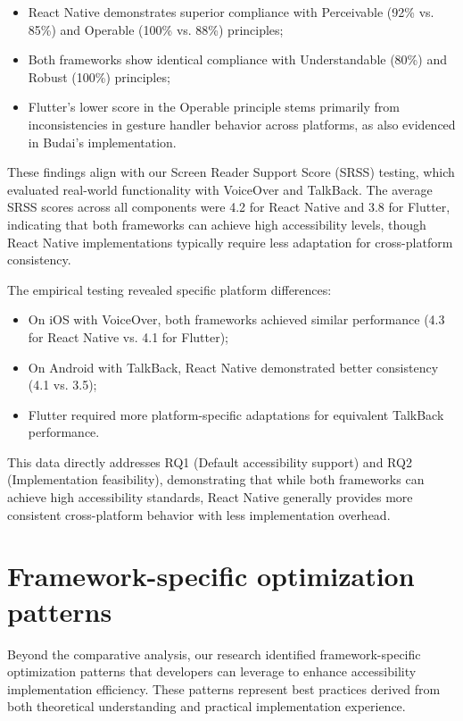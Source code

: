 \begin{itemize}
    \item React Native demonstrates superior compliance with Perceivable (92\% vs. 85\%) and Operable (100\% vs. 88\%) principles;
    \item Both frameworks show identical compliance with Understandable (80\%) and Robust (100\%) principles;
    \item Flutter's lower score in the Operable principle stems primarily from inconsistencies in gesture handler behavior across platforms, as also evidenced in Budai's implementation.
\end{itemize}

These findings align with our Screen Reader Support Score (SRSS) testing, which evaluated real-world functionality with VoiceOver and TalkBack. The average SRSS scores across all components were 4.2 for React Native and 3.8 for Flutter, indicating that both frameworks can achieve high accessibility levels, though React Native implementations typically require less adaptation for cross-platform consistency.

The empirical testing revealed specific platform differences:

\begin{itemize}
    \item On iOS with VoiceOver, both frameworks achieved similar performance (4.3 for React Native vs. 4.1 for Flutter);
    \item On Android with TalkBack, React Native demonstrated better consistency (4.1 vs. 3.5);
    \item Flutter required more platform-specific adaptations for equivalent TalkBack performance.
\end{itemize}

This data directly addresses RQ1 (Default accessibility support) and RQ2 (Implementation feasibility), demonstrating that while both frameworks can achieve high accessibility standards, React Native generally provides more consistent cross-platform behavior with less implementation overhead.

\section{Framework-specific optimization patterns}
\label{sec:optimization-patterns}

Beyond the comparative analysis, our research identified framework-specific optimization patterns that developers can leverage to enhance accessibility implementation efficiency. These patterns represent best practices derived from both theoretical understanding and practical implementation experience.

